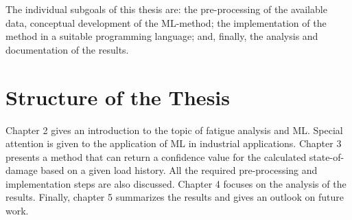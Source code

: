 The individual subgoals of this thesis are: the pre-processing of the available data, conceptual development of the ML-method; the implementation of the method in a suitable programming language; and, finally, the analysis and documentation of the results.

\section{Structure of the Thesis}
Chapter 2 gives an introduction to the topic of fatigue analysis and ML. Special attention is given to the application of ML in industrial applications. Chapter 3 presents a method that can return a confidence value for the calculated state-of-damage based on a given load history. All the required pre-processing and implementation steps are also discussed. Chapter 4 focuses on the analysis of the results. Finally, chapter 5 summarizes the results and gives an outlook on future work.
